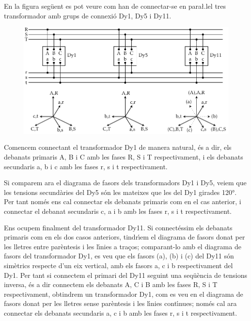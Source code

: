 \begin{exemple}
    En la figura seg\"{u}ent es pot veure com han de connectar-se en para{\l.l}el tres transformador amb grups de connexi\'{o} Dy1, Dy5 i Dy11.
    \begin{figure}[h]
    \centering
        \includegraphics{Imatges/Cap-TrafosPot-Exemple-TR-parallel.pdf}
    \end{figure}

    Comencem connectant el  transformador Dy1 de manera natural, \'{e}s a dir, els debanats primaris A, B i C amb les fases R, S i T respectivament, i els debanats secundaris a, b i c amb les fases r, s i t respectivament.

    Si comparem ara el diagrama de fasors dels transformadors Dy1 i Dy5, veiem que les tensions secund\`{a}ries del Dy5 s\'{o}n les mateixes que les del Dy1 girades \ang{120}. Per tant nom\'{e}s ens cal connectar els debanats primaris com en el cas anterior, i connectar el debanat secundaris c, a i b amb les fases r, s i t respectivament.

    Ens ocupem finalment del transformador Dy11. Si connect\'{e}ssim els debanats primaris com en els dos casos anteriors, tindr\'{\i}em el diagrama de fasors donat per les lletres entre par\`{e}ntesis i les l\'{\i}nies a tra\c{c}os; comparant-lo amb el diagrama de fasors del transformador Dy1, es veu que els fasors (a), (b) i (c) del Dy11 s\'{o}n sim\`{e}trics respecte d'un eix vertical, amb els fasors a, c i b respectivament del Dy1. Per tant si connectem el primari del Dy11 seguint una seq\"{u}\`{e}ncia de tensions inversa, \'{e}s a dir connectem els debanats A, C i B amb les fases R, S i T respectivament, obtindrem un transformador Dy1, com es veu en el diagrama de fasors donat per les lletres sense par\`{e}ntesis i les l\'{\i}nies cont\'{\i}nues; nom\'{e}s cal ara connectar els debanats secundaris a, c i b amb les fases r, s i t respectivament.
\end{exemple}

